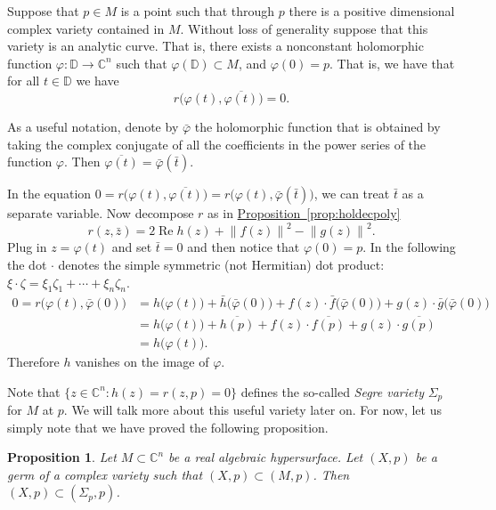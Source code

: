 \documentclass[12pt,openany]{book}
\renewcommand{\Re}{\operatorname{Re}}
\newcommand{\norm}[1]{\left\lVert {#1} \right\rVert}
\newcommand{\C}{{\mathbb{C}}}
\newcommand{\bD}{{\mathbb{D}}}
\newcommand{\myindex}[1]{#1\index{#1}}
\theoremstyle{plain}
\newtheorem{prop}[thm]{Proposition}
\theoremstyle{remark}
\theoremstyle{definition}
\theoremstyle{exercise}
\theoremstyle{example}
\newcommand{\propref}[1]{\hyperref[#1]{Proposition~\ref*{#1}}}
\begin{document}
Suppose that $p \in M$ is a point such that through $p$
there is a positive dimensional
complex variety contained in $M$.  Without loss of generality suppose that
this variety is an analytic curve.  That is, there exists a nonconstant
holomorphic
function $\varphi \colon \bD \to \C^n$ such that $\varphi(\bD) \subset M$,
and $\varphi(0) = p$.
That is,
we have that for all $t \in \bD$ we have
\begin{equation}
r\bigl(\varphi(t),\overline{\varphi(t)}\bigr) = 0 .
\end{equation}

As a useful notation, denote by $\bar{\varphi}$ the holomorphic
function that is obtained by taking the complex conjugate of
all the coefficients in the power series of the function $\varphi$.  Then
$\overline{\varphi(t)} = 
\bar{\varphi}(\bar{t})$.

In the equation
$0 = r\bigl(\varphi(t),\overline{\varphi(t)}\bigr) = 
r\bigl(\varphi(t),\bar{\varphi}(\bar{t})\bigr)$, we can treat $\bar{t}$ as a separate
variable.  Now decompose $r$ as in \propref{prop:holdecpoly}
\begin{equation}
r(z,\bar{z}) = 2 \Re h(z) + \norm{f(z)}^2-\norm{g(z)}^2 .
\end{equation}
Plug in $z=\varphi(t)$ and set $\bar{t} = 0$ and then notice that $\varphi(0) =
p$.  In the following the dot $\cdot$ denotes the simple symmetric (not Hermitian)
dot product:
$\xi \cdot \zeta = \xi_1 \zeta_1 + \cdots + \xi_n \zeta_n$.
\begin{equation}
\begin{split}
0 = 
r\bigl(\varphi(t),\bar{\varphi}(0)) & =
h\bigl(\varphi(t)\bigr)
+
\bar{h}\bigl(\bar{\varphi}(0)\bigr)
+ f(z)\cdot \bar{f}\bigl(\bar{\varphi}(0)\bigr)
+ g(z)\cdot \bar{g}\bigl(\bar{\varphi}(0)\bigr)
\\
& =
h\bigl(\varphi(t)\bigr)
+
\overline{h(p)}
+ f(z)\cdot \overline{f(p)}
+ g(z)\cdot \overline{g(p)}
\\
& = h\bigl(\varphi(t)\bigr) .
\end{split}
\end{equation}
Therefore $h$ vanishes on the image of $\varphi$.

Note that $\{ z \in \C^n : h(z) = r(z,p) = 0 \}$ defines the so-called
\emph{\myindex{Segre variety}} $\Sigma_p$ for $M$ at $p$.  We will talk
more about this useful variety later on.  For now, let us simply note that
we have proved the following proposition.

\begin{prop}
Let $M \subset \C^n$ be a real algebraic hypersurface.
Let $(X,p)$ be a germ of a complex variety such that
$(X,p) \subset (M,p)$.  Then $(X,p) \subset (\Sigma_p,p)$.
\end{prop}
\end{document}
